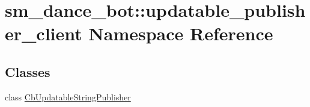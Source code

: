 \hypertarget{namespacesm__dance__bot_1_1updatable__publisher__client}{}\section{sm\+\_\+dance\+\_\+bot\+:\+:updatable\+\_\+publisher\+\_\+client Namespace Reference}
\label{namespacesm__dance__bot_1_1updatable__publisher__client}
\subsection*{Classes}
\begin{DoxyCompactItemize}
\item 
class \hyperlink{classsm__dance__bot_1_1updatable__publisher__client_1_1CbUpdatableStringPublisher}{Cb\+Updatable\+String\+Publisher}
\end{DoxyCompactItemize}

